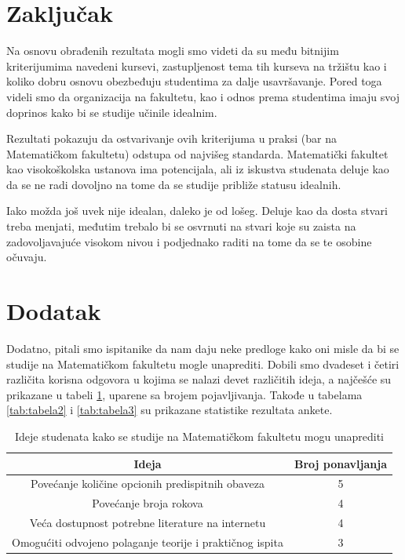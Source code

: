 \documentclass[a4paper]{article}
\begin{document}
\section{Zaključak}
\label{sec:zakljucak}

Na osnovu obrađenih rezultata mogli smo videti da su među bitnijim kriterijumima navedeni kursevi, zastupljenost tema tih kurseva na tržištu kao i koliko dobru osnovu obezbeđuju studentima za dalje usavršavanje. Pored toga videli smo da organizacija na fakultetu, kao i odnos prema studentima imaju svoj doprinos kako bi se studije učinile idealnim. 

Rezultati pokazuju da ostvarivanje ovih kriterijuma u praksi (bar na Matematičkom fakultetu) odstupa od najvišeg standarda. Matematički fakultet kao visokoškolska ustanova ima potencijala, ali iz iskustva studenata deluje kao da se ne radi dovoljno na tome da se studije približe statusu idealnih. 

Iako možda još uvek nije idealan, daleko je od lošeg. Deluje kao da dosta stvari treba menjati, međutim trebalo bi se osvrnuti na stvari koje su zaista na zadovoljavajuće visokom nivou i podjednako raditi na tome da se te osobine očuvaju.  


\appendix
 


\appendix
\newpage
\section{Dodatak}
\label{sec:dodatak}
Dodatno, pitali smo ispitanike da nam daju neke predloge kako oni misle da bi se studije na Matematičkom fakultetu mogle unaprediti. Dobili smo dvadeset i četiri različita korisna odgovora u kojima se nalazi devet različitih ideja, a najčešće su prikazane u tabeli \ref{tab:tabela1}, uparene sa brojem pojavljivanja. Takođe u tabelama \ref{tab:tabela2} i \ref{tab:tabela3} su prikazane statistike rezultata ankete.\\

\begin{table}[h!]
\begin{center}
\caption{Ideje studenata kako se studije na Matematičkom fakultetu mogu unaprediti}
\begin{tabular}{|c|c|} \hline
Ideja& Broj ponavljanja\\ \hline

Povećanje količine opcionih predispitnih obaveza & 5\\ \hline
Povećanje broja rokova & 4\\ \hline
Veća dostupnost potrebne literature na internetu & 4\\ \hline
Omogućiti odvojeno polaganje teorije i praktičnog ispita & 3\\ \hline
\end{tabular}
\label{tab:tabela1}

\end{center}
\end{table}
\end{document}

